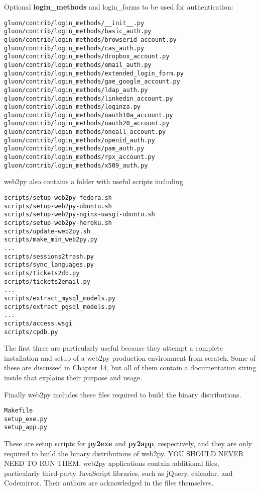 \documentclass[justified,sixbynine,notoc]{tufte-book}
\begin{document}
\begin{fullwidth}
Optional {\bf login\_methods} and login\_forms to be used for authentication:
\begin{lstlisting}
gluon/contrib/login_methods/__init__.py
gluon/contrib/login_methods/basic_auth.py
gluon/contrib/login_methods/browserid_account.py
gluon/contrib/login_methods/cas_auth.py
gluon/contrib/login_methods/dropbox_account.py
gluon/contrib/login_methods/email_auth.py
gluon/contrib/login_methods/extended_login_form.py
gluon/contrib/login_methods/gae_google_account.py
gluon/contrib/login_methods/ldap_auth.py
gluon/contrib/login_methods/linkedin_account.py
gluon/contrib/login_methods/loginza.py
gluon/contrib/login_methods/oauth10a_account.py
gluon/contrib/login_methods/oauth20_account.py
gluon/contrib/login_methods/oneall_account.py
gluon/contrib/login_methods/openid_auth.py
gluon/contrib/login_methods/pam_auth.py
gluon/contrib/login_methods/rpx_account.py
gluon/contrib/login_methods/x509_auth.py
\end{lstlisting}
\noindent web2py also contains a folder with useful scripts including
\begin{lstlisting}
scripts/setup-web2py-fedora.sh
scripts/setup-web2py-ubuntu.sh
scripts/setup-web2py-nginx-uwsgi-ubuntu.sh
scripts/setup-web2py-heroku.sh
scripts/update-web2py.sh
scripts/make_min_web2py.py
...
scripts/sessions2trash.py
scripts/sync_languages.py
scripts/tickets2db.py
scripts/tickets2email.py
...
scripts/extract_mysql_models.py
scripts/extract_pgsql_models.py
...
scripts/access.wsgi
scripts/cpdb.py
\end{lstlisting}

The first three are particularly useful because they attempt a complete installation and setup of a web2py production environment from scratch.
Some of these are discussed in Chapter 14, but all of them contain a documentation string inside that explains their purpose and usage.

Finally web2py includes these files required to build the binary distributions.
\begin{lstlisting}
Makefile
setup_exe.py
setup_app.py
\end{lstlisting}

These are setup scripts for {\bf py2exe} and {\bf py2app}, respectively, and they are only required to build the binary distributions of web2py. YOU SHOULD NEVER NEED TO RUN THEM.
\noindent web2py applications contain additional files, particularly third-party JavaScript libraries, such as jQuery, calendar, and Codemirror. Their authors are acknowledged in the files themselves.


\end{fullwidth}
\end{document}
